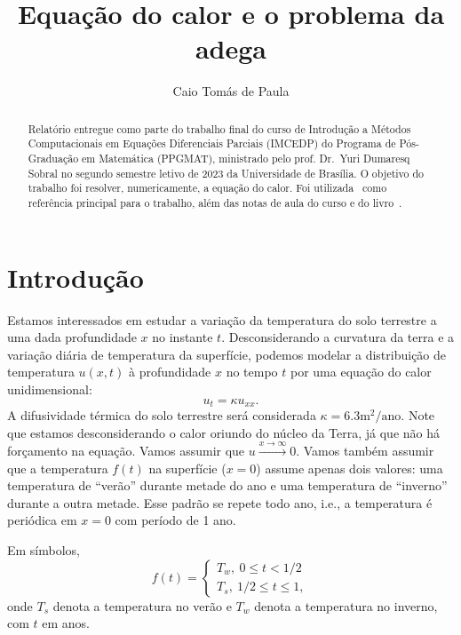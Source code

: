 \documentclass[twocolumn,showpacs,%
  nofootinbib,aps,superscriptaddress,%
  eqsecnum,prd,notitlepage,showkeys,10pt]{revtex4-1} %
\renewcommand{\leq}{\leqslant}
\begin{document}
\title{
  Equação do calor e o problema da adega
}
\author{Caio Tomás de Paula}
%
\begin{abstract}
    Relatório entregue como parte do trabalho final do curso de Introdução a
    Métodos Computacionais em Equações Diferenciais Parciais (IMCEDP) do
    Programa de Pós-Graduação em Matemática (PPGMAT),
    ministrado pelo prof. Dr.~Yuri Dumaresq Sobral no segundo semestre letivo
    de 2023 da Universidade de Brasília.
    O objetivo do trabalho foi resolver, numericamente, a equação do calor.
    Foi utilizada~\cite{lin1998} como referência principal para o trabalho, além
    das notas de aula do curso e do livro~\cite{Iserles}.
\end{abstract}
%
\maketitle
%
\section{Introdução}
%
	Estamos interessados em estudar a variação da temperatura do solo terrestre a uma dada
	profundidade $x$ no instante $t$. Desconsiderando a curvatura da terra e a variação diária
	de temperatura da superfície, podemos modelar a distribuição de temperatura $u(x,t)$ à
	profundidade $x$ no tempo $t$ por uma equação do calor unidimensional:
	\begin{equation}
		u_t = \kappa u_{xx}.
	\end{equation}
	A difusividade térmica do solo terrestre será considerada $\kappa = 6.3\text{m}^2/\text{ano}$.
	Note que estamos desconsiderando o calor oriundo do núcleo da Terra, já que não há forçamento
	na equação. Vamos assumir que $u \xrightarrow{x\to\infty} 0$. Vamos também assumir que
	a temperatura $f(t)$ na superfície ($x = 0$) assume apenas dois valores: uma temperatura
	de ``verão'' durante metade do ano e uma temperatura de ``inverno'' durante a outra metade.
	Esse padrão se repete todo ano, i.e., a temperatura é periódica em $x=0$ com período de 1 ano.

	Em símbolos,
	\begin{equation}
		f(t) = \begin{cases}
			T_w, \ 0 \leq t < 1/2 \\
			T_s, \ 1/2 \leq t \leq 1,
		\end{cases}
	\end{equation}
	onde $T_s$ denota a temperatura no verão e $T_w$ denota a temperatura no inverno, com $t$ em anos.
\end{document}
